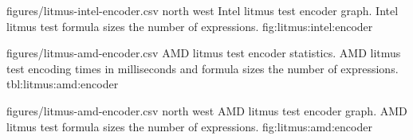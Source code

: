 
\EncoderStatsGraph
  {figures/litmus-intel-encoder.csv}
  {north west}
  {Intel litmus test encoder graph.}
  {Intel litmus test formula sizes  the number of expressions.}
  {fig:litmus:intel:encoder}

\EncoderStatsTable
  {figures/litmus-amd-encoder.csv}
  {\textnumero}
  {\AMDRowHeader}
  {AMD litmus test encoder statistics.}
  {AMD litmus test encoding times in milliseconds and formula sizes  the number of expressions.}
  {tbl:litmus:amd:encoder}


\EncoderStatsGraph
  {figures/litmus-amd-encoder.csv}
  {north west}
  {AMD litmus test encoder graph.}
  {AMD litmus test formula sizes  the number of expressions.}
  {fig:litmus:amd:encoder}




\newpage


